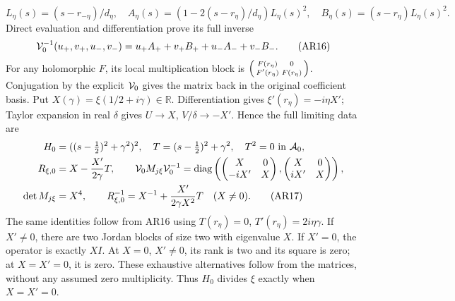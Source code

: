 \documentclass[11pt]{article}
\newcommand{\diag}{\operatorname{diag}}
\begin{document}
\[
L_\eta(s)=(s-r_{-\eta})/d_\eta,\quad
A_\eta(s)=(1-2(s-r_\eta)/d_\eta)L_\eta(s)^2,\quad
B_\eta(s)=(s-r_\eta)L_\eta(s)^2.
\]
Direct evaluation and differentiation prove its full inverse
\begin{equation}
{\cal V}_0^{-1}(u_+,v_+,u_-,v_-)
=u_+A_++v_+B_++u_-A_-+v_-B_-.
\tag{AR16}
\end{equation}
For any holomorphic $F$, its local multiplication block is
$\begin{psmallmatrix}F(r_\eta)&0\\F'(r_\eta)&F(r_\eta)\end{psmallmatrix}$.
Conjugation by the explicit $ {\cal V}_0$ gives the matrix
back in the original coefficient basis.
Put $X(\gamma)=\xi(1/2+i\gamma)\in\mathbb R$.
Differentiation gives $\xi'(r_\eta)=-i\eta X'$;
Taylor expansion in real $\delta$ gives $U\to X$,
$V/\delta\to-X'$. Hence the full limiting data are
\begin{align}
H_0&=((s-\tfrac12)^2+\gamma^2)^2,\quad
T=(s-\tfrac12)^2+\gamma^2,\quad T^2=0\text{ in }{\cal A}_0,\nonumber\\
R_{\xi,0}&=X-\frac{X'}{2\gamma}T,\qquad
{\cal V}_0M_{j\xi}{\cal V}_0^{-1}
=\diag\left(\begin{pmatrix}X&0\\-iX'&X\end{pmatrix},
            \begin{pmatrix}X&0\\iX'&X\end{pmatrix}\right),\nonumber\\
\det M_{j\xi}&=X^4,\qquad
R_{\xi,0}^{-1}=X^{-1}+\frac{X'}{2\gamma X^2}T\quad(X\ne0).
\tag{AR17}
\end{align}
The same identities follow from AR16 using
$T(r_\eta)=0$, $T'(r_\eta)=2i\eta\gamma$.
If $X'\ne0$, there are two Jordan blocks of size two with
eigenvalue $X$. If $X'=0$, the operator is exactly $XI$.
At $X=0$, $X'\ne0$, its rank is two and its square is zero;
at $X=X'=0$, it is zero. These exhaustive alternatives follow
from the matrices, without any assumed zero multiplicity.
Thus $H_0$ divides $\xi$ exactly when $X=X'=0$.
\end{document}
